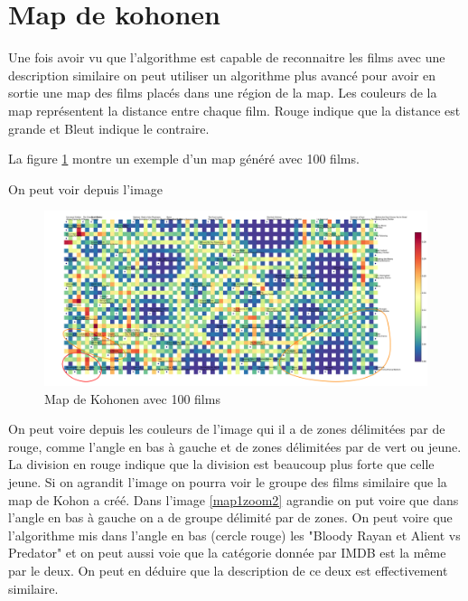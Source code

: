 \section{Map de kohonen}

Une fois avoir vu que l'algorithme est capable de reconnaitre les films avec une description similaire on peut utiliser un algorithme plus avancé pour avoir en sortie une map des films placés dans une région de la map. Les couleurs de la map représentent la distance entre chaque film. Rouge indique que la distance est grande et Bleut indique le contraire.

La figure \ref{map1} montre un exemple d'un map généré avec 100 films.

On peut voir depuis l'image
\begin{figure}[h]
	\centering
	\includegraphics[width=1\linewidth]{img/map-cluster.png}
	\caption{Map de Kohonen avec 100 films}
	\label{map1}
\end{figure}

On peut voire depuis les couleurs de l'image qui il a de zones délimitées par de rouge, comme l'angle en bas à gauche et de zones délimitées par de vert ou jeune. La division en rouge indique que la division est beaucoup plus forte que celle jeune. Si on agrandit l'image on pourra voir le groupe des films similaire que la map de Kohon a créé.
Dans l'image \ref{map1zoom2} agrandie on put voire que dans l'angle en bas à gauche on a de groupe délimité par de zones. On peut voire que l'algorithme mis dans l'angle en bas (cercle rouge) les "Bloody Rayan et Alient vs Predator" et on peut aussi voie que la catégorie donnée par IMDB est la même par le deux. On peut en déduire que la description de ce deux est effectivement similaire.

